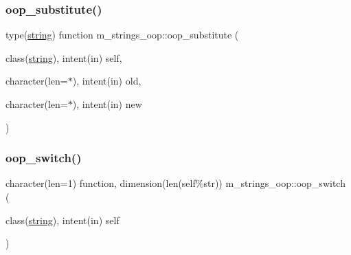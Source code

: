 \mbox{\label{namespacem__strings__oop_af653c84bbd0165d1d4a3b61efe0472e8}} 
\subsubsection{\texorpdfstring{oop\+\_\+substitute()}{oop\_substitute()}}
{\footnotesize\ttfamily type(\mbox{\hyperlink{structm__strings__oop_1_1string}{string}}) function m\+\_\+strings\+\_\+oop\+::oop\+\_\+substitute (\begin{DoxyParamCaption}\item[{class(\mbox{\hyperlink{structm__strings__oop_1_1string}{string}}), intent(in)}]{self,  }\item[{character(len=$\ast$), intent(in)}]{old,  }\item[{character(len=$\ast$), intent(in)}]{new }\end{DoxyParamCaption})\hspace{0.3cm}{\ttfamily [private]}}

\mbox{\label{namespacem__strings__oop_a31be80e67fa4829b5ac48c530bd58b7b}} 
\subsubsection{\texorpdfstring{oop\+\_\+switch()}{oop\_switch()}}
{\footnotesize\ttfamily character(len=1) function, dimension(len(self\%str)) m\+\_\+strings\+\_\+oop\+::oop\+\_\+switch (\begin{DoxyParamCaption}\item[{class(\mbox{\hyperlink{structm__strings__oop_1_1string}{string}}), intent(in)}]{self }\end{DoxyParamCaption})\hspace{0.3cm}{\ttfamily [private]}}

\mbox{\label{namespacem__strings__oop_ac88f27671dd1129023494bf2500ca7fd}} 
